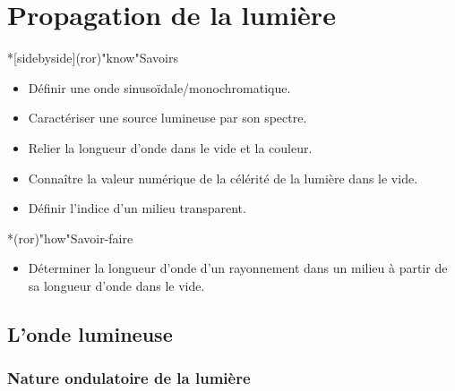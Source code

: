 \documentclass[../../main/main.tex]{subfiles}
\begin{document}
\chapter{Propagation de la lumi\`ere}

\begin{prgm}
	\begin{tcb}*[sidebyside](ror)"know"{Savoirs}
		\begin{itemize}[label=$\diamond$, leftmargin=10pt]
			\item Définir une onde sinusoïdale/monochromatique.
			\item Caractériser une source lumineuse par son spectre.
			\item Relier la longueur d'onde dans le vide et la couleur.
		\end{itemize}
		\tcblower
		\begin{itemize}[label=$\diamond$, leftmargin=10pt]
			\item Connaître la valeur numérique de la célérité de la lumière dans le
			      vide.
			\item Définir l'indice d'un milieu transparent.
		\end{itemize}
	\end{tcb}

	\begin{tcb}*(ror)"how"{Savoir-faire}
		\begin{itemize}[label=$\diamond$, leftmargin=10pt]
			\item Déterminer la longueur d'onde d'un rayonnement dans un milieu à partir
			      de sa longueur d'onde dans le vide.
		\end{itemize}
	\end{tcb}
\end{prgm}

\section{L'onde lumineuse}

\subsection{Nature ondulatoire de la lumière}
\end{document}
